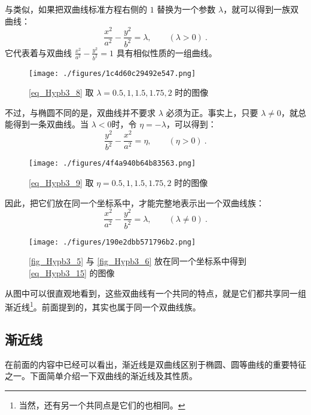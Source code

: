 与类似，如果把双曲线标准方程右侧的 $1$ 替换为一个参数 $\lambda$，就可以得到一族双曲线：
\begin{equation}\label{eq_Hypb3_8}
\frac{x^2}{a^2} - \frac{y^2}{b^2} = \lambda,\qquad(\lambda>0)~.
\end{equation}
它代表着与双曲线 $\displaystyle\frac{x^2}{a^2} - \frac{y^2}{b^2} = 1$ 具有相似性质的一组曲线。

\begin{figure}[ht]
\centering
\texttt{[image: ./figures/1c4d60c29492e547.png]}
\caption{\autoref{eq_Hypb3_8} 取 $\lambda=0.5,1,1.5,1.75,2$ 时的图像} \label{fig_Hypb3_5}
\end{figure}

不过，与椭圆不同的是，双曲线并不要求 $\lambda$ 必须为正。事实上，只要 $\lambda\neq0$，就总能得到一条双曲线。当 $\lambda<0$时，令 $\eta=-\lambda$，可以得到：
\begin{equation}\label{eq_Hypb3_9}
\frac{y^2}{b^2}-\frac{x^2}{a^2} = \eta,\qquad(\eta>0)~.
\end{equation}

\begin{figure}[ht]
\centering
\texttt{[image: ./figures/4f4a940b64b83563.png]}
\caption{\autoref{eq_Hypb3_9} 取 $\eta=0.5,1,1.5,1.75,2$ 时的图像} \label{fig_Hypb3_6}
\end{figure}

因此，把它们放在同一个坐标系中，才能完整地表示出一个双曲线族：
\begin{equation}\label{eq_Hypb3_15}
\frac{x^2}{a^2} - \frac{y^2}{b^2} = \lambda,\qquad(\lambda\neq0)~.
\end{equation}

\begin{figure}[ht]
\centering
\texttt{[image: ./figures/190e2dbb571796b2.png]}
\caption{\autoref{fig_Hypb3_5} 与 \autoref{fig_Hypb3_6} 放在同一个坐标系中得到 \autoref{eq_Hypb3_15} 的图像} \label{fig_Hypb3_7}
\end{figure}

从图中可以很直观地看到，这些双曲线有一个共同的特点，就是它们都共享同一组渐近线\footnote{当然，还有另一个共同点是它们的也相同。}。前面提到的，其实也属于同一个双曲线族。

\subsection{渐近线}

在前面的内容中已经可以看出，渐近线是双曲线区别于椭圆、圆等曲线的重要特征之一。下面简单介绍一下双曲线的渐近线及其性质。

